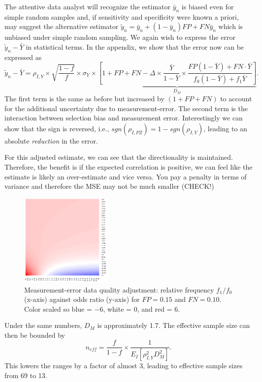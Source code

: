\documentclass[11pt]{amsart}
\begin{document}
The attentive data analyst will recognize the estimator $\bar y_n$ is biased even for simple random samples and, if sensitivity and specificity were known a priori, may suggest the alternative estimator $\tilde y_n = \bar y_n + (1-\bar y_n) FP + FN \bar y_n$ which is unbiased under simple random sampling. We again wish to express the error $\tilde  y_n - \bar Y$ in statistical terms. In the appendix, we show that the error now can be expressed as
$$
\tilde y_n - \bar Y = \rho_{I,Y} \times \sqrt{\frac{1-f}{f}} \times \sigma_{Y}
\times \underbrace{\left[ 1 + FP + FN - \Delta \times \frac{\bar Y}{1-\bar Y} \times \frac{FP(1-\bar Y) + FN \cdot \bar Y}{f_0 (1-\bar Y) + f_1 \bar Y} \right]}_{D_M}.
$$
The first term is the same as before but increased by $(1 + FP + FN)$ to account for the additional uncertainty due to measurement-error.  The second term is the interaction between selection bias and measurement error.  Interestingly we can show that the sign is reversed, i.e., $sgn(\rho_{I,PZ}) = 1 - sgn(\rho_{I,Y})$, leading to an absolute \emph{reduction} in the error.

For this adjusted estimate, we can see that the directionality is maintained.  Therefore, the benefit is if the expected correlation is positive, we can feel like the estimate is likely an over-estimate and vice versa.  You pay a penalty in terms of variance and therefore the MSE may not be much smaller (CHECK!)

\begin{figure}
\centering
\includegraphics[width = 0.4\textwidth]{../methods/figs/mem_heatmap_article.png}
\caption{Measurement-error data quality adjustment: relative frequency $f_1/f_0$ (x-axis) against odds ratio (y-axis) for $FP=0.15$ and $FN=0.10$. Color scaled so blue = $-6$, white = 0, and red = $6$.}
\vspace{-0.7cm}
\end{figure}

Under the same numbers, $D_M$ is approximately 1.7.  The effective sample size can then be bounded by
$$
n_{eff} = \frac{f}{1-f} \times \frac{1}{E_{I} \left[ \rho_{I,Y}^2 D_M^2 \right]}.
$$
This lowers the ranges by a factor of almost $3$, leading to effective sample sizes from 69 to 13.
\end{document}
